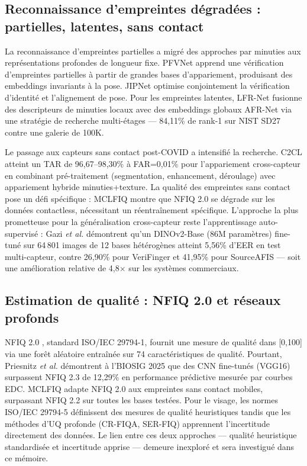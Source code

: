 \documentclass[12pt,a4paper]{report}
\begin{document}
\subsection{Reconnaissance d'empreintes d\'{e}grad\'{e}es : partielles, latentes, sans contact}

La reconnaissance d'empreintes partielles a migr\'{e} des approches par minuties aux repr\'{e}sentations profondes de longueur fixe. PFVNet \cite{he2022pfvnet} apprend une v\'{e}rification d'empreintes partielles \`{a} partir de grandes bases d'appariement, produisant des embeddings invariants \`{a} la pose. JIPNet \cite{guan2025jipnet} optimise conjointement la v\'{e}rification d'identit\'{e} et l'alignement de pose. Pour les empreintes latentes, LFR-Net \cite{grosz2023lfrnet} fusionne des descripteurs de minuties locaux avec des embeddings globaux AFR-Net via une strat\'{e}gie de recherche multi-\'{e}tages --- 84,11\% de rank-1 sur NIST SD27 contre une galerie de 100K.

Le passage aux capteurs sans contact post-COVID a intensifi\'{e} la recherche. C2CL \cite{grosz2022c2cl} atteint un TAR de 96,67--98,30\% \`{a} FAR=0,01\% pour l'appariement cross-capteur en combinant pr\'{e}-traitement (segmentation, enhancement, d\'{e}roulage) avec appariement hybride minuties+texture. La qualit\'{e} des empreintes sans contact pose un d\'{e}fi sp\'{e}cifique : MCLFIQ \cite{priesnitz2023mclfiq} montre que NFIQ 2.0 se d\'{e}grade sur les donn\'{e}es contactless, n\'{e}cessitant un r\'{e}entra\^{i}nement sp\'{e}cifique. L'approche la plus prometteuse pour la g\'{e}n\'{e}ralisation cross-capteur reste l'apprentissage auto-supervis\'{e} : Gazi \textit{et al.} \cite{gazi2026minutiae} d\'{e}montrent qu'un DINOv2-Base (86M param\`{e}tres) fine-tun\'{e} sur 64\,801 images de 12 bases h\'{e}t\'{e}rog\`{e}nes atteint 5,56\% d'EER en test multi-capteur, contre 26,90\% pour VeriFinger et 41,95\% pour SourceAFIS --- soit une am\'{e}lioration relative de 4,8$\times$ sur les syst\`{e}mes commerciaux.

\subsection{Estimation de qualit\'{e} : NFIQ 2.0 et r\'{e}seaux profonds}

NFIQ 2.0 \cite{tabassi2021nfiq}, standard ISO/IEC 29794-1, fournit une mesure de qualit\'{e} dans [0,100] via une for\^{e}t al\'{e}atoire entra\^{i}n\'{e}e sur 74 caract\'{e}ristiques de qualit\'{e}. Pourtant, Priesnitz \textit{et al.} \cite{priesnitz2025deep} d\'{e}montrent \`{a} l'BIOSIG 2025 que des CNN fine-tun\'{e}s (VGG16) surpassent NFIQ 2.3 de 12,29\% en performance pr\'{e}dictive mesur\'{e}e par courbes EDC. MCLFIQ \cite{priesnitz2023mclfiq} adapte NFIQ 2.0 aux empreintes sans contact mobiles, surpassant NFIQ 2.2 sur toutes les bases test\'{e}es. Pour le visage, les normes ISO/IEC 29794-5 d\'{e}finissent des mesures de qualit\'{e} heuristiques tandis que les m\'{e}thodes d'UQ profonde (CR-FIQA, SER-FIQ) apprennent l'incertitude directement des donn\'{e}es. Le lien entre ces deux approches --- qualit\'{e} heuristique standardis\'{e}e et incertitude apprise --- demeure inexplor\'{e} et sera investigu\'{e} dans ce m\'{e}moire.
\end{document}
